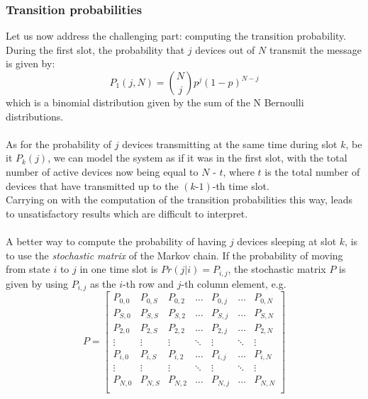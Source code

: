 \subsubsection{Transition probabilities}
Let us now address the challenging part: computing the transition probability.\\
During the first slot, the probability that $j$ devices out of $N$ transmit
the message is given by:
\begin{equation}
    P_{1}(j, N) = {N \choose j} p^{j} (1 - p)^{N - j}
    \label{eq:firstSlotTransProb}
\end{equation}
which is a binomial distribution given by the sum of the N Bernoulli distributions.\\
\\
As for the probability of $j$ devices transmitting at the same time during slot
$k$, be it $P_{k}(j)$, we can model the system as if it was in the first slot,
with the total number of active devices now being equal to $N$ - $t$, where $t$
is the total number of devices that have transmitted up to the $(k\text{-}1)$-th
time slot.\\
Carrying on with the computation of the transition probabilities this way, leads
to unsatisfactory results which are difficult to interpret.\\
\\
A better way to compute the probability of having $j$ devices sleeping at
slot $k$, is to use the \textit{stochastic matrix} of the Markov chain. If the
probability of moving from state $i$ to $j$ in one time slot is
$Pr(j|i) = P_{i,j}$, the stochastic matrix $P$ is given by using
$P_{i,j}$ as the $i$-th row and $j$-th column element, e.g.
\begin{equation*}
P = 
\begin{bmatrix}
P_{0,0}	& P_{0,S}	& P_{0,2}	& \dots  	& P_{0,j}	& \dots		& P_{0,N} \\
P_{S,0}	& P_{S,S}	& P_{S,2}	& \dots  	& P_{S,j}	& \dots		& P_{S,N} \\
P_{2,0}	& P_{2,S}	& P_{2,2}	& \dots  	& P_{2,j}	& \dots		& P_{2,N} \\
\vdots	& \vdots	& \vdots	& \ddots 	& \vdots	& \ddots	& \vdots \\
P_{i,0}	& P_{i,S}	& P_{i,2}	& \dots		& P_{i,j}	& \dots		& P_{i,N} \\
\vdots	& \vdots	& \vdots	& \ddots	& \vdots	& \ddots	& \vdots \\
P_{N,0}	& P_{N,S}	& P_{N,2}	& \dots		& P_{N,j}	& \dots		& P_{N,N} \\
\end{bmatrix}
\label{stochasticMatrix1}
\end{equation*}
